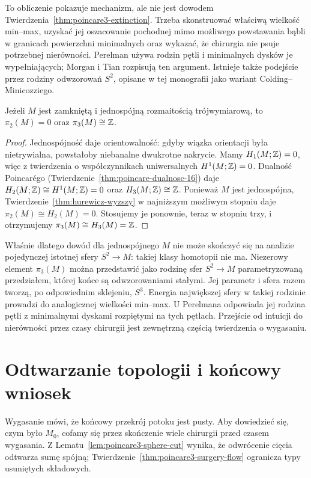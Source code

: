To obliczenie pokazuje mechanizm, ale nie jest
dowodem Twierdzenia~\ref{thm:poincare3-extinction}.
Trzeba skonstruować właściwą wielkość min--max,
uzyskać jej oszacowanie pochodnej mimo możliwego
powstawania bąbli w granicach powierzchni
minimalnych oraz wykazać, że chirurgia nie
psuje potrzebnej nierówności. Perelman używa
rodzin pętli i minimalnych dysków je wypełniających;
Morgan i Tian rozpisują ten argument. Istnieje
także podejście przez rodziny odwzorowań $S^2$,
opisane w tej monografii jako wariant
Colding--Minicozziego.

\begin{lemat}
\label{lem:poincare3-pi3}
Jeżeli $M$ jest zamkniętą i jednospójną
rozmaitością trójwymiarową, to
$\pi_2(M)=0$ oraz $\pi_3(M)\cong\mathbb{Z}$.
\end{lemat}
\begin{proof}
Jednospójność daje orientowalność: gdyby
wiązka orientacji była nietrywialna, powstałoby
niebanalne dwukrotne nakrycie. Mamy $H_1(M;\mathbb{Z})=0$,
więc z twierdzenia o współczynnikach
uniwersalnych $H^1(M;\mathbb{Z})=0$.
Dualność Poincarégo
(Twierdzenie~\ref{thm:poincare-dualnosc-16})
daje $H_2(M;\mathbb{Z})\cong H^1(M;\mathbb{Z})=0$
oraz $H_3(M;\mathbb{Z})\cong\mathbb{Z}$.
Ponieważ $M$ jest jednospójna,
Twierdzenie~\ref{thm:hurewicz-wyzszy}
w najniższym możliwym stopniu daje
$\pi_2(M)\cong H_2(M)=0$.
Stosujemy je ponownie, teraz w stopniu trzy,
i otrzymujemy $\pi_3(M)\cong H_3(M)=\mathbb{Z}$.
\end{proof}

Właśnie dlatego dowód dla jednospójnego $M$
nie może skończyć się na analizie pojedynczej
istotnej sfery $S^2\to M$: takiej klasy
homotopii nie ma. Niezerowy element $\pi_3(M)$
można przedstawić jako rodzinę sfer
$S^2\to M$ parametryzowaną przedziałem,
której końce są odwzorowaniami stałymi.
Jej parametr i sfera razem tworzą, po
odpowiednim sklejeniu, $S^3$.
Energia największej sfery w takiej rodzinie
prowadzi do analogicznej wielkości min--max.
U Perelmana odpowiada jej rodzina pętli
z minimalnymi dyskami rozpiętymi na tych
pętlach. Przejście od intuicji do nierówności
przez czasy chirurgii jest zewnętrzną częścią
twierdzenia o wygasaniu.

\section{Odtwarzanie topologii i końcowy wniosek}
\label{sec:poincare3-topologia}

Wygasanie mówi, że końcowy przekrój potoku jest
pusty. Aby dowiedzieć się, czym było $M_0$,
cofamy się przez skończenie wiele chirurgii
przed czasem wygasania. Z Lematu~\ref{lem:poincare3-sphere-cut}
wynika, że odwrócenie cięcia odtwarza sumę
spójną; Twierdzenie~\ref{thm:poincare3-surgery-flow}
ogranicza typy usuniętych składowych.


